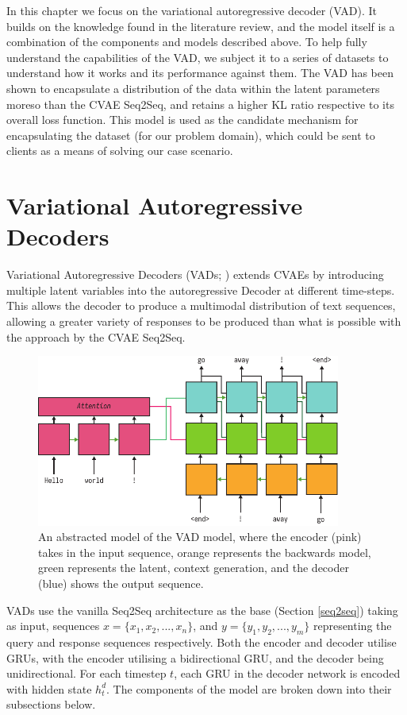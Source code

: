 \documentclass[12pt,twoside]{report}
\begin{document}
In this chapter we focus on the variational autoregressive decoder (VAD). It builds on the knowledge found in the literature review, and the model itself is a combination of the components and models described above. To help fully understand the capabilities of the VAD, we subject it to a series of datasets to understand how it works and its performance against them. The VAD has been shown to encapsulate a distribution of the data within the latent parameters moreso than the CVAE Seq2Seq, and retains a higher KL ratio respective to its overall loss function. This model is used as the candidate  mechanism for encapsulating the dataset (for our problem domain), which could be sent to clients as a means of solving our case scenario.

\section{Variational Autoregressive Decoders}

Variational Autoregressive Decoders (VADs; \cite{du_variational_2018}) extends CVAEs by introducing multiple latent variables into the autoregressive Decoder at different time-steps. This allows the decoder to produce a multimodal distribution of text sequences, allowing a greater variety of responses to be produced than what is possible with the approach by the CVAE Seq2Seq.

\begin{figure}[!ht]
		
	\centering
	\includegraphics[width=100mm]{diagrams/vad.pdf}
	\caption{An abstracted model of the VAD model, where the encoder (pink) takes in the input sequence, orange represents the backwards model, green represents the latent, context generation, and the decoder (blue) shows the output sequence.\label{vad_abstract}}
	\end{figure}

VADs use the vanilla Seq2Seq architecture as the base (Section \ref{seq2seq}) taking as input, sequences $x = \{x_1, x_2, ..., x_n\}$, and $y = \{y_1, y_2, ..., y_m\}$ representing the query and response sequences respectively. Both the encoder and decoder utilise GRUs, with the encoder utilising a bidirectional GRU, and the decoder being unidirectional. For each timestep $t$, each GRU in the decoder network is encoded with hidden state $h^d_t$. The components of the model are broken down into their subsections below.
\end{document}
